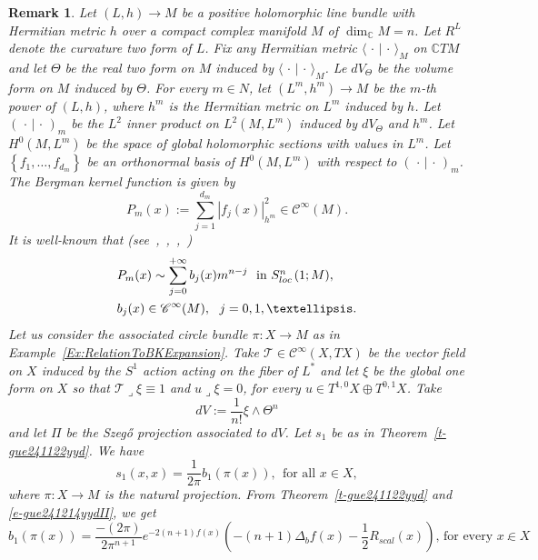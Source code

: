 \documentclass[12pt]{amsart}
\newtheorem{remark}[theorem]{Remark}
\theoremstyle{definition}
\theoremstyle{named}
\numberwithin{equation}{subsection}
\newcommand{\C}{\mathbb{C}}
\newcommand{\abs}[1]{\left\vert#1\right\vert}
\newcommand{\set}[1]{\left\{#1\right\}}
\newcommand{\To}{\rightarrow}
\def\cC{\mathscr{C}}
\begin{document}
\begin{remark}\label{rmk:CoefficientsOnComplexManifolds}%
 Let \((L,h)\to M\) be a positive holomorphic line bundle with Hermitian metric \(h\) over a compact complex manifold \(M\) of \(\dim_\C M=n\). Let $R^L$ denote the curvature two form of $L$. Fix any Hermitian metric $\langle\,\cdot\,|\,\cdot\,\rangle_M$ on $\mathbb CTM$ and let $\Theta$ be the real two form on $M$ induced by $\langle\,\cdot\,|\,\cdot\,\rangle_M$. 
    Le $dV_{\Theta}$ be the volume form on $M$ induced by $\Theta$. For every $m\in N$, let \((L^m,h^m)\to M\) be the $m$-th power of $(L,h)$, where $h^m$ is the Hermitian metric on $L^m$ induced by $h$. Let $(\,\cdot\,|\,\cdot\,)_m$ be the $L^2$ inner product on $L^2(M,L^m)$ induced by $dV_{\Theta}$ and $h^m$. Let $H^0(M,L^m)$ be the space of global holomorphic sections with values in $L^m$. Let $\set{f_1,\ldots,f_{d_m}}$ be an orthonormal basis of $H^0(M,L^m)$ with respect to $(\,\cdot\,|\,\cdot\,)_m$. The Bergman kernel function is given by 
    \begin{equation}\label{e-gue241214yyd}
P_m(x):=\sum^{d_m}_{j=1}\abs{f_j(x)}^2_{h^m}\in\cC^\infty(M).
    \end{equation}
    It is well-known that (see~\cite{Catlin_BKE_1999},~\cite{HM14},~\cite{Ma_Marinescu_HMI_BKE_2007},~\cite{Zelditch_BKE_1998})
    \begin{equation}\label{e-gue241214yydI}
    \begin{split}
&P_m(x)\sim\sum^{+\infty}_{j=0}b_j(x)m^{n-j}\ \ \mbox{in $S^n_{{\rm loc\,}}(1;M)$},\\
&b_j(x)\in\cC^\infty(M),\ \ j=0,1,\ldots.
\end{split}
    \end{equation}
   Let  us consider the associated circle bundle \(\pi\colon X\to M\) as in Example~\ref{Ex:RelationToBKExpansion}. Take $\mathcal{T}\in\cC^\infty(X,TX)$ be the vector field on $X$ induced by the $S^1$ action acting on the fiber of $L^*$ and let $\xi$ be the global one form on $X$ so that $\mathcal{T}\lrcorner\xi\equiv1$ and $u\lrcorner\xi=0$, for every $u\in T^{1,0}X\oplus T^{0,1}X$. Take 
   \begin{equation}\label{e-gue241214yydIIIw}
   dV:=\frac{1}{n!}\xi\wedge\Theta^n
   \end{equation}
   and let $\Pi$ be the Szeg\H{o} projection associated to $dV$. 
   Let $s_1$ be as in Theorem~\ref{t-gue241122yyd}. We have 
   \begin{equation}\label{e-gue241214yydII}
   s_1(x,x)=\frac{1}{2\pi}b_1(\pi(x)),\ \ \mbox{for all $x\in X$},
   \end{equation}
   where $\pi: X\To M$ is the natural projection. From Theorem~\ref{t-gue241122yyd} and \eqref{e-gue241214yydII}, we get 
   \begin{equation}\label{e-gue241214ycdb}
\mbox{$b_1(\pi(x))=\frac{-(2\pi)}{2\pi^{n+1}}e^{-2(n+1)f(x)}\left(-(n+1)\Delta_b f(x)-\frac{1}{2}R_{scal}(x)\right)$, for every $x\in X$}.
   \end{equation}


\end{remark}
\end{document}
